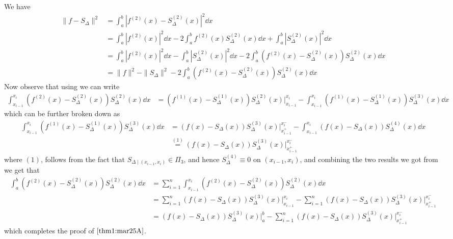 \begin{prf}
    We have 
    \begin{align*}
        \| f - S_{\Delta} \|^2 
        &= \int_a^b \left|f^{(2)}(x) - S^{(2)}_{\Delta}(x)\right|^2 \dd{x} \\ 
        &= \int_a^b \left|f^{(2)}(x)\right|^2 \dd{x} - 2 \int_a^b f^{(2)}(x)S_{\Delta}^{(2)}(x) \dd{x} + \int_a^b \left|S_{\Delta}^{(2)}(x)\right|^2 \dd{x} \\ 
        &= \int_a^b \left|f^{(2)}(x)\right|^2 \dd{x} - \int_a^b \left|S^{(2)}_{\Delta}(x)\right|^2 \dd{x} - 2 \int_a^b \left(f^{(2)}(x) - S_{\Delta}^{(2)}(x)\right) S_{\Delta}^{(2)}(x) \dd{x} \\ 
        &= \| f \|^2 - \| S_{\Delta} \|^2 - 2 \int_a^b \left(f^{(2)}(x) - S_{\Delta}^{(2)}(x)\right) S_{\Delta}^{(2)}(x) \dd{x}
    \end{align*}
    Now observe that using  we can write 
    \begin{align*}
        \int_{x_{i-1}}^{x_i} \left(f^{(2)}(x) - S_{\Delta}^{(2)}(x)\right) S_{\Delta}^{(2)}(x) \dd{x} &= \left(f^{(1)}(x) - S_{\Delta}^{(1)}(x)\right) S_{\Delta}^{(2)}(x) \Big\vert_{x_{i-1}}^{x_i} - \int_{x_{i-1}}^{x_i} \left(f^{(1)}(x) - S_{\Delta}^{(1)}(x)\right) S_{\Delta}^{(3)}(x) \dd{x} 
    \end{align*}
    which can be further broken down as 
    \begin{align*}
        \int_{x_{i-1}}^{x_i} \left(f^{(1)}(x) - S_{\Delta}^{(1)}(x)\right) S_{\Delta}^{(3)}(x) \dd{x} &= \left(f(x) - S_{\Delta}(x)\right) S_{\Delta}^{(3)}(x) \Big\vert_{x_{i-1}^+}^{x_i^-} - \int_{x_{i-1}}^{x_i} \left(f(x) - S_{\Delta}(x)\right) S_{\Delta}^{(4)}(x) \dd{x} \\ 
        &\overset{(1)}{=} \left(f(x) - S_{\Delta}(x)\right) S_{\Delta}^{(3)}(x) \Big\vert_{x_{i-1}^+}^{x_i^-} 
    \end{align*}
    where $(1)$, follows from the fact that $S_{\Delta \mid (x_{i-1},x_i)} \in \Pi_3$, and hence $S^{(4)}_{\Delta} \equiv 0 $ on $(x_{i-1},x_i)$, and combining the two results we got from  we get that 
    \begin{align*}
        \int_{a}^{b} \left(f^{(2)}(x) - S_{\Delta}^{(2)}(x)\right) S_{\Delta}^{(2)}(x) \dd{x} 
        &= \sum_{i=1}^n \int_{x_{i-1}}^{x_i} \left(f^{(2)}(x) - S_{\Delta}^{(2)}(x)\right) S_{\Delta}^{(2)}(x) \dd{x} \\ 
        &= \sum_{i=1}^n \left(f(x) - S_{\Delta}(x)\right) S_{\Delta}^{(3)}(x) \Big\vert_{x_{i-1}}^{x_i} - \sum_{i=1}^n \left(f(x) - S_{\Delta}(x)\right) S_{\Delta}^{(3)}(x) \Big\vert_{x_{i-1}^+}^{x_i^-} \\ 
        &= (f(x) - S_{\Delta}(x)) S^{(3)}_{\Delta}(x) \Big\vert_a^b - \sum_{i=1}^n \left(f(x) - S_{\Delta}(x)\right) S_{\Delta}^{(3)}(x) \Big\vert_{x_{i-1}^+}^{x_i^-}
    \end{align*}
    which completes the proof of  $\ref{thm1:mar25A}$.
\end{prf}

